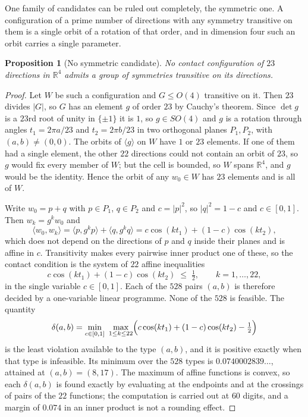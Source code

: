 \documentclass[11pt,reqno]{amsart}
\renewcommand{\_}{\origunderscore\allowbreak}
\numberwithin{equation}{section}
\theoremstyle{plain}
\newtheorem{prop}[thm]{Proposition}
\theoremstyle{definition}
\theoremstyle{remark}
\begin{document}
One family of candidates can be ruled out completely, the symmetric one.
A configuration of a prime number of directions
with any symmetry transitive on them is a single orbit of a rotation
of that order, and in dimension four such an orbit carries a single
parameter.

\begin{prop}[No symmetric candidate]\label{prop:no-transitive}
No contact configuration of $23$ directions in $\mathbb{R}^4$ admits a
group of symmetries transitive on its directions.
\end{prop}

\begin{proof}
Let $W$ be such a configuration and $G\le O(4)$ transitive on it. Then
$23$ divides $|G|$, so $G$ has an element $g$ of order $23$ by Cauchy's
theorem. Since $\det g$ is a $23$rd root of unity in $\{\pm1\}$ it is $1$,
so $g\in SO(4)$ and $g$ is a rotation through angles $t_1=2\pi a/23$ and
$t_2=2\pi b/23$ in two orthogonal planes $P_1,P_2$, with $(a,b)\ne(0,0)$.
The orbits of $\langle g\rangle$ on $W$ have $1$ or $23$ elements. If
one of them had a single element, the other $22$ directions could not
contain an orbit of $23$, so $g$ would fix every member of $W$; but the
cell is bounded, so $W$ spans $\mathbb{R}^4$, and $g$ would be the
identity. Hence the orbit of any $w_0\in W$ has $23$ elements and is
all of $W$.

Write $w_0=p+q$ with $p\in P_1$, $q\in P_2$ and $c=|p|^2$, so $|q|^2=1-c$
and $c\in[0,1]$. Then $w_k=g^kw_0$ and
\[
  \langle w_0,w_k\rangle=\langle p,g^kp\rangle+\langle q,g^kq\rangle
  =c\cos(kt_1)+(1-c)\cos(kt_2),
\]
which does not depend on the directions of $p$ and $q$ inside their planes
and is affine in $c$. Transitivity makes every pairwise inner product one
of these, so the contact condition is the system of $22$ affine
inequalities
\[
  c\cos(kt_1)+(1-c)\cos(kt_2)\;\le\;\tfrac12,\qquad k=1,\dots,22,
\]
in the single variable $c\in[0,1]$. Each of the $528$ pairs $(a,b)$ is
therefore decided by a one-variable linear programme. None of the $528$ is
feasible. The quantity
\[
  \delta(a,b)=\min_{c\in[0,1]}\ \max_{1\le k\le22}
    \Bigl(c\cos(kt_1)+(1-c)\cos(kt_2)-\tfrac12\Bigr)
\]
is the least violation available to the type $(a,b)$, and it is positive
exactly when that type is infeasible. Its minimum over the $528$ types is
$0.0740002839\ldots$, attained at $(a,b)=(8,17)$. The maximum of affine
functions is convex, so each $\delta(a,b)$ is found exactly by evaluating
at the endpoints and at the crossings of pairs of the $22$ functions; the
computation is carried out at $60$ digits, and a margin of $0.074$ in an inner
product is not a rounding effect.
\end{proof}
\end{document}
